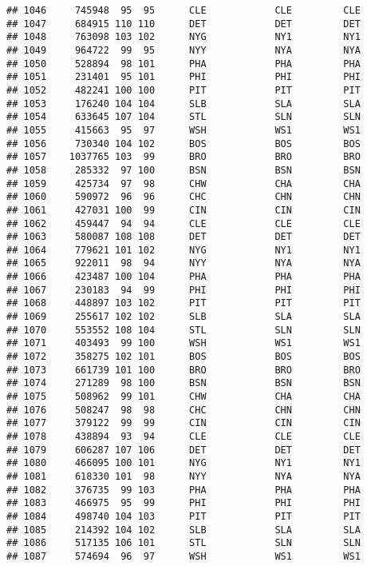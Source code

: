 \documentclass[]{article}
\begin{document}
\begin{verbatim}
## 1046     745948  95  95      CLE            CLE         CLE
## 1047     684915 110 110      DET            DET         DET
## 1048     763098 103 102      NYG            NY1         NY1
## 1049     964722  99  95      NYY            NYA         NYA
## 1050     528894  98 101      PHA            PHA         PHA
## 1051     231401  95 101      PHI            PHI         PHI
## 1052     482241 100 100      PIT            PIT         PIT
## 1053     176240 104 104      SLB            SLA         SLA
## 1054     633645 107 104      STL            SLN         SLN
## 1055     415663  95  97      WSH            WS1         WS1
## 1056     730340 104 102      BOS            BOS         BOS
## 1057    1037765 103  99      BRO            BRO         BRO
## 1058     285332  97 100      BSN            BSN         BSN
## 1059     425734  97  98      CHW            CHA         CHA
## 1060     590972  96  96      CHC            CHN         CHN
## 1061     427031 100  99      CIN            CIN         CIN
## 1062     459447  94  94      CLE            CLE         CLE
## 1063     580087 108 108      DET            DET         DET
## 1064     779621 101 102      NYG            NY1         NY1
## 1065     922011  98  94      NYY            NYA         NYA
## 1066     423487 100 104      PHA            PHA         PHA
## 1067     230183  94  99      PHI            PHI         PHI
## 1068     448897 103 102      PIT            PIT         PIT
## 1069     255617 102 102      SLB            SLA         SLA
## 1070     553552 108 104      STL            SLN         SLN
## 1071     403493  99 100      WSH            WS1         WS1
## 1072     358275 102 101      BOS            BOS         BOS
## 1073     661739 101 100      BRO            BRO         BRO
## 1074     271289  98 100      BSN            BSN         BSN
## 1075     508962  99 101      CHW            CHA         CHA
## 1076     508247  98  98      CHC            CHN         CHN
## 1077     379122  99  99      CIN            CIN         CIN
## 1078     438894  93  94      CLE            CLE         CLE
## 1079     606287 107 106      DET            DET         DET
## 1080     466095 100 101      NYG            NY1         NY1
## 1081     618330 101  98      NYY            NYA         NYA
## 1082     376735  99 103      PHA            PHA         PHA
## 1083     466975  95  99      PHI            PHI         PHI
## 1084     498740 104 103      PIT            PIT         PIT
## 1085     214392 104 102      SLB            SLA         SLA
## 1086     517135 106 101      STL            SLN         SLN
## 1087     574694  96  97      WSH            WS1         WS1

\end{verbatim}
\end{document}
